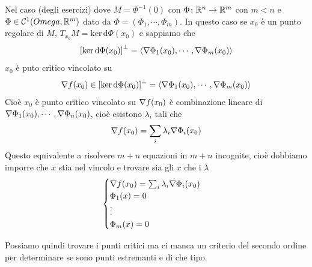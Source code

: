\documentclass[a4paper]{article}
\begin{document}
Nel caso (degli esercizi) dove \(M=\Phi^{-1}(0)\)
con \(\Phi\colon \mathbb{R}^n \to \mathbb{R}^m\)
con \(m<n\) e \(\Phi \in \mathcal{C}^1(Omega, \mathbb{R}^m)\)
dato da \(\Phi = (\Phi_1, \cdots, \Phi_m)\).
In questo caso se \(x_0\) è un punto regolare di \(M\),
\(T_{x_0}M = \text{ker}\,\text{d}\Phi(x_0)\) e sappiamo che
\[
    {[\text{ker}\,\text{d}\Phi(x_0)]}^\perp = \langle 
        \nabla \Phi_1(x_0), \cdots,
        \nabla \Phi_m(x_0) \rangle
\]
\(x_0\) è puto critico vincolato su
\[
    \nabla f(x_0) \in
    {[\text{ker}\,\text{d}\Phi(x_0)]}^\perp = \langle 
        \nabla \Phi_1(x_0), \cdots,
        \nabla \Phi_m(x_0) \rangle
\]
Cioè \(x_0\) è punto critico vincolato su \(\nabla f(x_0)\) è combinazione lineare
di \(\nabla \Phi_1(x_0), \cdots, \nabla \Phi_n(x_0)\),
cioè esistono \(\lambda_i\) tali che
\[
    \nabla f(x_0) = \sum_i \lambda_i \nabla \Phi_i(x_0)
\]
Questo equivalente a risolvere \(m+n\) equazioni in \(m+n\) incognite,
cioè dobbiamo imporre che \(x\) stia nel vincolo e trovare sia gli \(x\) che i \(\lambda\)
\[
    \begin{cases}
        \nabla f(x_0) = \sum_i \lambda_i \nabla \Phi_i(x_0) \\
        \Phi_1(x) = 0 \\
        \vdots \\
        \Phi_m(x) = 0
    \end{cases}
\]

Possiamo quindi trovare i punti critici ma ci manca un criterio del secondo ordine
per determinare se sono punti estremanti e di che tipo.
\end{document}
